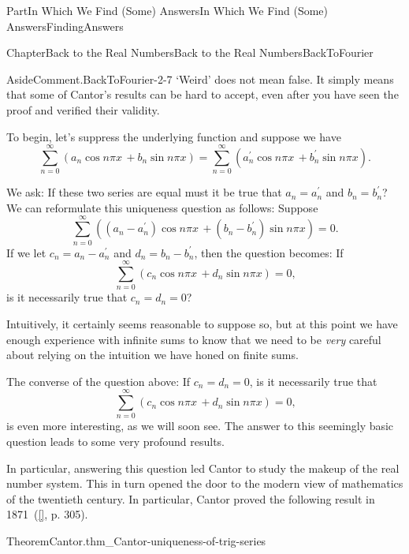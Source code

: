 \documentclass[oneside,10pt,]{book}
\newcommand{\xreffont}{\relax}
\numberwithin{equation}{part}
\begin{document}
\begin{partptx}{Part}{In Which We Find (Some) Answers}{}{In Which We Find (Some) Answers}{}{}{FindingAnswers}
\begin{chapterptx}{Chapter}{Back to the Real Numbers}{}{Back to the Real Numbers}{}{}{BackToFourier}
\begin{introduction}{}
\begin{aside}{Aside}{Comment.}{BackToFourier-2-7}%
`Weird' does not mean false.  It simply means that some of Cantor's results can be hard to accept, even after you have seen the proof and verified their validity.%
\end{aside}
To begin, let's suppress the underlying function and suppose we have%
\begin{equation*}
\sum_{n=0}^\infty(a_n\cos n\pi x\,+b_n\sin n\pi x) = \sum_{n=0}^\infty(a^\prime_n\cos n\pi x\,+b^\prime_n\sin n\pi x)\text{.}
\end{equation*}
%
\par
We ask: If these two series are equal must it be true that \(a_n=a^\prime_n\) and \(b_n=b^\prime_n\)? We can reformulate this uniqueness question as follows: Suppose%
\begin{equation*}
\displaystyle\sum_{n=0}^\infty\left((a_n-a^\prime_n)\cos n\pi x\,+(b_n-b^\prime_n)\sin n\pi x\right) = 0\text{.}
\end{equation*}
If we let \(c_n = a_n-a^\prime_n\) and \(d_n =
b_n-b^\prime_n\), then the question becomes: If%
\begin{equation*}
\sum_{n=0}^\infty\left(c_n\cos n\pi x\,+d_n\sin n\pi x\right)
= 0\text{,}
\end{equation*}
is it necessarily true that \(c_n=d_n=0\)?%
\par
Intuitively, it certainly seems reasonable to suppose so, but at this point we have enough experience with infinite sums to know that we need to be \emph{very} careful about relying on the intuition we have honed on finite sums.%
\par
{} The converse of the question above: If \(c_n=d_n=0\), is it necessarily true that%
\begin{equation*}
\sum_{n=0}^\infty\left(c_n\cos n\pi
x\,+d_n\sin n\pi x\right) = 0\text{,}
\end{equation*}
is even more interesting, as we will soon see.  The answer to this seemingly basic question leads to some very profound results.%
\par
In particular, answering this question led Cantor to study the makeup of the real number system.  This in turn opened the door to the modern view of mathematics of the twentieth century.  In particular, Cantor proved the following result in 1871~(\hyperlink{jahnke03__histor_analy}{[{\xreffont 6}]}, p. 305).%
\begin{theorem}{Theorem}{Cantor.}{}{thm_Cantor-uniqueness-of-trig-series}%

\end{theorem}
\end{introduction}
\end{chapterptx}
\end{partptx}
\end{document}
